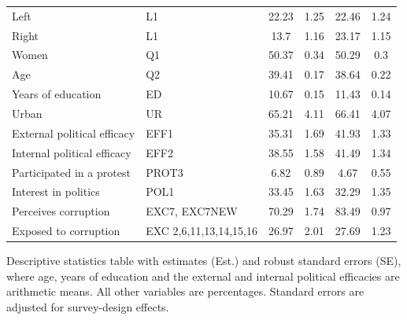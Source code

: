 \documentclass[12pt,a4]{article}\usepackage[]{graphicx}\usepackage[]{xcolor}
\begin{document}
\begin{table}[htbp!]
\begin{center}
\begin{tabular}{llcccc}
Left                                          & L1                                                                                      & 22.23    & 1.25           & 22.46    & 1.24           \\
Right                                         & L1                                                                                      & 13.7     & 1.16           & 23.17    & 1.15           \\
Women                                         & Q1                                                                                      & 50.37    & 0.34           & 50.29    & 0.3            \\
Age                                           & Q2                                                                                      & 39.41    & 0.17           & 38.64    & 0.22           \\
Years of education                            & ED                                                                                      & 10.67    & 0.15           & 11.43    & 0.14           \\
Urban                                         & UR                                                                                      & 65.21    & 4.11           & 66.41    & 4.07           \\
External political efficacy                   & EFF1                                                                                    & 35.31    & 1.69           & 41.93    & 1.33           \\
Internal political efficacy                   & EFF2                                                                                    & 38.55    & 1.58           & 41.49    & 1.34           \\
Participated in a protest                     & PROT3                                                                                   & 6.82     & 0.89           & 4.67     & 0.55           \\
Interest in politics & POL1 & 33.45 & 1.63 & 32.29 & 1.35 \\
Perceives corruption                          & EXC7, EXC7NEW                                                                           & 70.29    & 1.74           & 83.49    & 0.97           \\
Exposed to corruption                         & EXC 2,6,11,13,14,15,16                                                                  & 26.97    & 2.01           & 27.69    & 1.23           \\ 
\bottomrule
\end{tabular}
\end{center}
Descriptive statistics table with estimates (Est.) and robust standard errors (SE), where age, years of education and the external and internal political efficacies are arithmetic means. All other variables are percentages. Standard errors are adjusted for survey-design effects.
\end{table}
\end{document}
